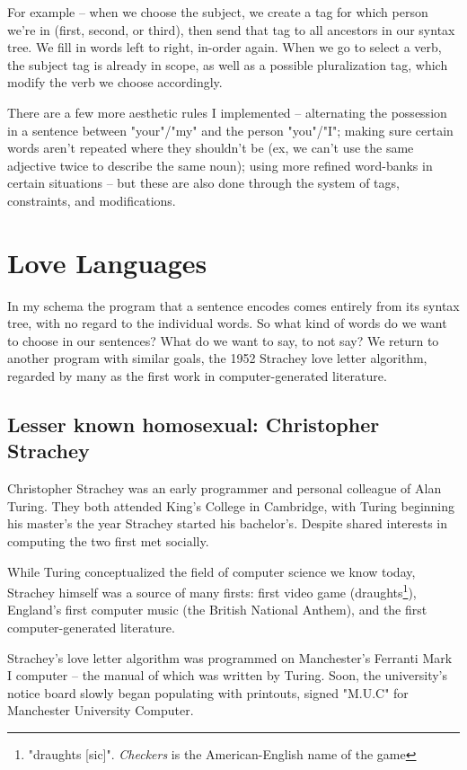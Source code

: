 \documentclass[runningheads]{llncs}
\begin{document}
For example -- when we choose the subject, we create a tag for which person we're in (first, second, or third), then send that tag to all ancestors in our syntax tree. We fill in words left to right, in-order again. When we go to select a verb, the subject tag is already in scope, as well as a possible pluralization tag, which modify the verb we choose accordingly.

There are a few more aesthetic rules I implemented -- alternating the possession in a sentence between "your"/"my" and the person "you"/"I"; making sure certain words aren't repeated where they shouldn't be (ex, we can't use the same adjective twice to describe the same noun); using more refined word-banks in certain situations -- but these are also done through the system of tags, constraints, and modifications.
\section{Love Languages}
In my schema the program that a sentence encodes comes entirely from its syntax tree, with no regard to the individual words. So what kind of words do we want to choose in our sentences? What do we want to say, to not say? We return to another program with similar goals, the 1952 Strachey love letter algorithm, regarded by many as the first work in computer-generated literature. \cite{gaboury2013}

\subsection{Lesser known homosexual: Christopher Strachey}
Christopher Strachey was an early programmer and personal colleague of Alan Turing. They both attended King's College in Cambridge, with Turing beginning his master's the year Strachey started his bachelor's. Despite shared interests in computing the two first met socially.

While Turing conceptualized the field of computer science we know today, Strachey himself was a source of many firsts: first video game (draughts\footnote{"draughts [sic]". \textit{Checkers} is the American-English name of the game}), England's first computer music (the British National Anthem), and the first computer-generated literature.

Strachey's love letter algorithm was programmed on Manchester's Ferranti Mark I computer -- the manual of which was written by Turing. Soon, the university's notice board slowly began populating with printouts, signed "M.U.C" for Manchester University Computer.
\end{document}
